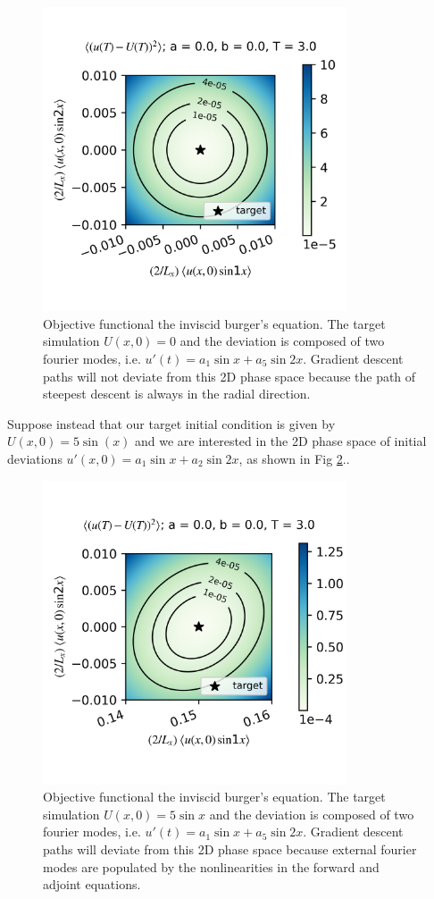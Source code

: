 \documentclass[longbibliography,twocolumn,amsmath,amssymb,aps,nofootinbib]{revtex4-2}
\begin{document}
\begin{figure}[H]
  \includegraphics[width=9cm]{objtest_a0p0b0p0T3p0R0p01kt10p0kt20.png}
  \caption{Objective functional the inviscid burger's equation. The target simulation $U(x, 0) = 0$ and the deviation is composed of two fourier modes, i.e. $u'(t) = a_1\sin x + a_5\sin 2x$. Gradient descent paths will not deviate from this 2D phase space because the path of steepest descent is always in the radial direction.}
  \label{brgU0}
\end{figure}

Suppose instead that our target initial condition is given by $U(x, 0) = 5\sin(x)$ and we are interested in the 2D phase space of initial deviations $u'(x, 0) = a_1\sin x + a_2 \sin 2x$, as shown in Fig \ref{brgU5m1}.. 

\begin{figure}[H]
  \includegraphics[width=9cm]{objtest_a0p0b0p0T3p0R0p01kt10p15kt20.png}
  \caption{Objective functional the inviscid burger's equation. The target simulation $U(x, 0) = 5\sin x$ and the deviation is composed of two fourier modes, i.e. $u'(t) = a_1\sin x + a_5\sin 2x$. Gradient descent paths will deviate from this 2D phase space because external fourier modes are populated by the nonlinearities in the forward and adjoint equations.}
  \label{brgU5m1}
\end{figure}


\clearpage

\end{document}
